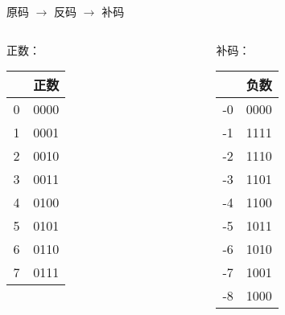 \begin{frame}{原码 $\rightarrow$ 反码 $\rightarrow$ 补码}
    \newpage
    ~\\
    \begin{center}
      \begin{columns}[t]
        \begin{column}{.25\textwidth}
         \centering
          正数：\\
          \begin{tabular}{| c | c |}
            \hline
            ~ & 正数 \\ \hline
            0 & 0000 \\ \hline
            1 & 0001 \\ \hline
            2 & 0010 \\ \hline
            3 & 0011 \\ \hline
            4 & 0100 \\ \hline
            5 & 0101 \\ \hline
            6 & 0110 \\ \hline
            7 & 0111 \\ \hline
          \end{tabular}
        \end{column}
        
        \begin{column}{.25\textwidth}
          \centering
          \color{blue} 补码：\\
          \begin{tabular}{| c | c |}
            \hline
            ~ & 负数 \\ \hline
            -0 & 0000 \\ \hline
            -1 & 1111 \\ \hline
            -2 & 1110 \\ \hline
            -3 & 1101 \\ \hline
            -4 & 1100 \\ \hline
            -5 & 1011 \\ \hline
            -6 & 1010 \\ \hline
            -7 & 1001 \\ \hline
            -8 & 1000 \\ \hline
          \end{tabular}
        \end{column}


\end{columns}
\end{center}
\end{frame}

